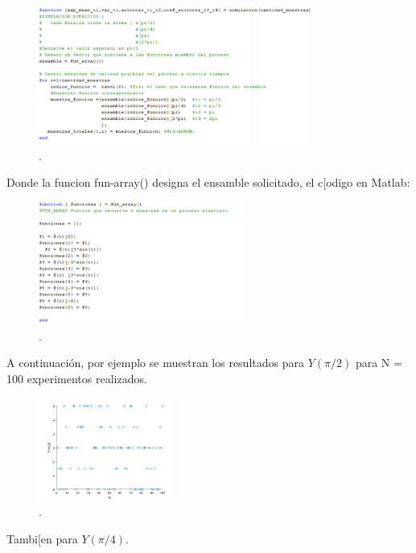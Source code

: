 \begin{figure}[H]
\centering
	\includegraphics[width=0.8\textwidth, trim = {0 0 0 0},clip]{./ImagenesEjercicio1/main1.png}
	\caption{.}
	\label{fig:main1}
\end{figure}

Donde la funcion fun-array() designa el ensamble solicitado, el c[odigo en Matlab:

\begin{figure}[H]
\centering
	\includegraphics[width=0.6\textwidth, trim = {0 0 0 0},clip]{./ImagenesEjercicio1/fun_array.png}
	\caption{.}
	\label{fig:fun_array}
\end{figure}

A continuación, por ejemplo se muestran los resultados para $Y(\pi/2)$ para N = 100 experimentos realizados.

\begin{figure}[H]
\centering
	\includegraphics[width=0.4\textwidth, trim = {0 0 0 0},clip]{./ImagenesEjercicio1/ypi_2.png}
	\caption{.}
	\label{fig:ypi_2}
\end{figure}

Tambi[en para $Y(\pi/4)$.

